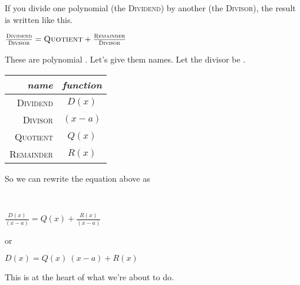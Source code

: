 If you divide one polynomial (the {\scshape Dividend}) 
by another (the {\scshape Divisor}),
the result is written like this. 
{
    \begin{center}
    $ 
    \frac
        {\text{\scshape Dividend\rule[-0.2em]{0em}{0.2em}}}
        {\text{\scshape Divisor\rule{0em}{0.75em}}} 
    =
    \text{\scshape Quotient} 
        + 
        \frac
            {\text{\scshape Remainder\rule[-0.2em]{0em}{0.2em}}}
            {\text{\scshape Divisor\rule{0em}{0.75em}}} 
    $
    \end{center}
}

These are polynomial . 
Let's give them names.
Let the divisor be .
\begin{center}
    \begin{tabular}{rc}
        {\itshape name} & {\itshape function} \\ 
        \midrule
        {\scshape Dividend} & $D(x)$ \\ 
        {\scshape Divisor} & $(x-a)$ \\ 
        {\scshape Quotient} & $Q(x)$ \\ 
        {\scshape Remainder} & $R(x)$ \\ 
    \end{tabular}
\end{center}

So we can rewrite the equation above as
{
\    \begin{center}
    $ 
    \frac
        {D(x)}
        {(x-a)} 
    =
    Q(x) 
        + 
        \frac
            {R(x)}
            {(x-a)} 
    $
    \end{center}
}
or
\begin{tcolorbox}[center,width=4in]
    {
        \begin{center}
        $ 
            D(x) = Q(x)\:(x-a)  +  R(x)
        $
        \end{center}
    }           
\end{tcolorbox}

This   is at the heart of what we're about to do.